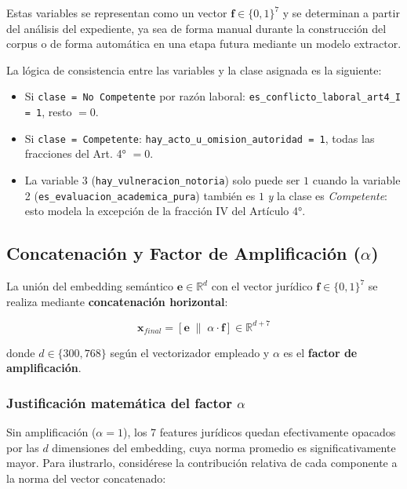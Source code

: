 Estas variables se representan como un vector $\mathbf{f} \in \{0, 1\}^7$ y
se determinan a partir del análisis del expediente, ya sea de forma manual
durante la construcción del corpus o de forma automática en una etapa futura
mediante un modelo extractor.

La lógica de consistencia entre las variables y la clase asignada es la
siguiente:

\begin{itemize}
  \item Si \texttt{clase = No Competente} por razón laboral:
        \texttt{es\_conflicto\_laboral\_art4\_I = 1}, resto $= 0$.
  \item Si \texttt{clase = Competente}: \texttt{hay\_acto\_u\_omision\_autoridad = 1},
        todas las fracciones del Art. 4° $= 0$.
  \item La variable 3 (\texttt{hay\_vulneracion\_notoria}) solo puede ser $1$
        cuando la variable 2 (\texttt{es\_evaluacion\_academica\_pura}) también
        es $1$ \emph{y} la clase es \textit{Competente}: esto modela la excepción
        de la fracción IV del Artículo 4°.
\end{itemize}

\subsection{Concatenación y Factor de Amplificación ($\alpha$)}

La unión del embedding semántico $\mathbf{e} \in \mathbb{R}^d$ con el vector
jurídico $\mathbf{f} \in \{0,1\}^7$ se realiza mediante \textbf{concatenación
horizontal}:

\begin{equation}
  \mathbf{x}_{final}
  = \left[\mathbf{e} \;\|\; \alpha \cdot \mathbf{f}\right]
  \in \mathbb{R}^{d + 7}
  \label{eq:concat}
\end{equation}

donde $d \in \{300, 768\}$ según el vectorizador empleado y $\alpha$ es el
\textbf{factor de amplificación}.

\subsubsection*{Justificación matemática del factor $\alpha$}

Sin amplificación ($\alpha = 1$), los 7 features jurídicos quedan efectivamente
opacados por las $d$ dimensiones del embedding, cuya norma promedio es
significativamente mayor. Para ilustrarlo, considérese la contribución relativa
de cada componente a la norma del vector concatenado:

